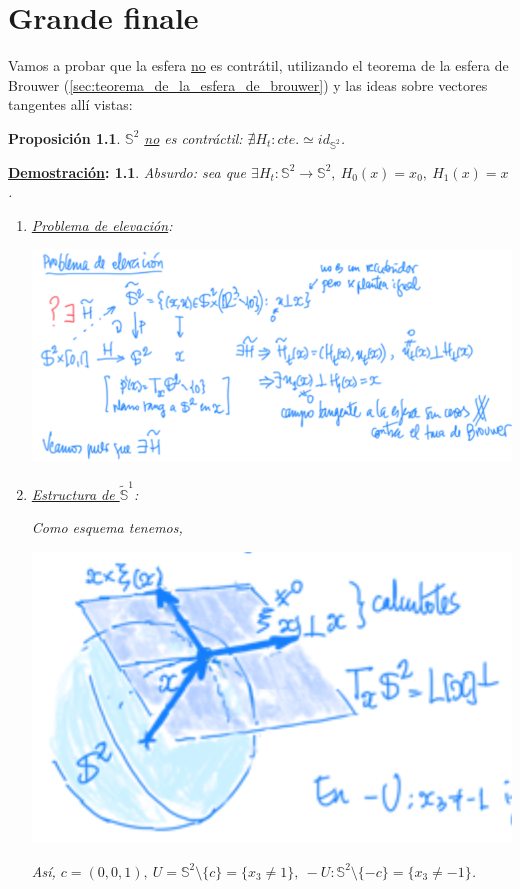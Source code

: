 \documentclass[10pt,a4paper,openright]{book}
\theoremstyle{break}
\newtheorem*{prop}{Proposición}
\newtheorem*{demo}{\underline{Demostración}:}
\begin{document}
\chapter{Grande finale}%
\label{cha:grande_finale}
Vamos a probar que la esfera \underline{no} es contrátil, utilizando el teorema de la esfera de Brouwer (\ref{sec:teorema_de_la_esfera_de_brouwer}) y las ideas sobre vectores tangentes allí vistas:
\begin{prop}
$\mathbb{S}^{2}$ \underline{no} es contráctil: $\nexists H_t: cte. \simeq id_{\mathbb{S}^{2}}$.
\end{prop}
\begin{demo}
Absurdo: sea que $\exists H_t: \mathbb{S}^{2} \rightarrow \mathbb{S}^{2},\ H_0\left( x \right) = x_0,\ H_1\left( x \right) = x$.
\begin{enumerate}
    \item \underline{Problema de elevación}:
    \begin{center}
        \includegraphics[scale=0.3]{images/prob_elevacion} 
    \end{center}

    \item \underline{Estructura de }$\tilde{\mathbb{S}}^1$: 

    Como esquema tenemos,
    \begin{center}
        \includegraphics[scale=0.3]{images/esquema_estr_s2} 
    \end{center}
    Así,
        $c = \left( 0, 0, 1 \right),\ U = \mathbb{S}^{2} \setminus \{c\} = \{x_3 \neq 1\},\ -U : \mathbb{S}^{2} \setminus \{-c\} = \{x_3 \neq -1\}$.


\end{enumerate}
\end{demo}
\end{document}
